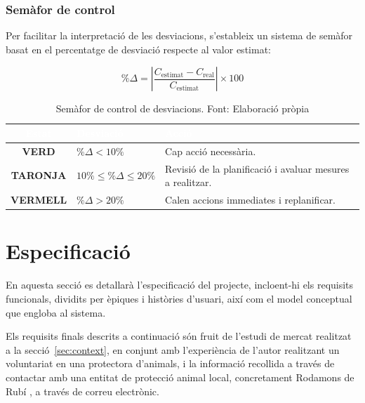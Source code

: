 \documentclass[11pt,a4paper]{report}
\begin{document}
\subsubsection{Semàfor de control}

Per facilitar la interpretació de les desviacions, s'estableix un sistema de semàfor 
basat en el percentatge de desviació respecte al valor estimat:

\begin{equation}
    \%\Delta = \left| \frac{C_{\text{estimat}} - C_{\text{real}}}{C_{\text{estimat}}} \right| \times 100
    \label{eq:percentatge_desv}
\end{equation}

\begin{table}[H]
    \centering
    \small
    \renewcommand{\arraystretch}{0.8}
    \begin{tabular}{|c|l|l|}
        \hline
        \rowcolor{oceanblue}
        \textcolor{white}{\textbf{Estat}} &
        \textcolor{white}{\textbf{Desviació}} &
        \textcolor{white}{\textbf{Acció}} \\
        \hline
        \cellcolor{green!50}\textbf{VERD}    & $\%\Delta < 10\%$          & Cap acció necessària. \\
        \hline
        \cellcolor{orange!60}\textbf{TARONJA} & $10\% \leq \%\Delta \leq 20\%$ & Revisió de la planificació i avaluar mesures a realitzar. \\
        \hline
        \cellcolor{red!50}\textbf{VERMELL}  & $\%\Delta > 20\%$          & Calen accions immediates i replanificar. \\
        \hline
    \end{tabular}
    \caption[Semàfor de control de desviacions]{Semàfor de control de desviacions. Font: Elaboració pròpia}
    \label{tab:semafar}
\end{table}
\newpage

\section{Especificació}
En aquesta secció es detallarà l'especificació del projecte, incloent-hi els requisits funcionals, dividits per èpiques i històries d'usuari, així com el model conceptual que engloba al sistema.

Els requisits finals descrits a continuació són fruit de l'estudi de mercat realitzat a la secció~\ref{sec:context}, en conjunt amb l'experiència de l'autor realitzant un voluntariat en una protectora d'animals, i la informació recollida a través de contactar amb una entitat de protecció animal local, concretament Rodamons de Rubí \cite{noauthor_gatos_nodate}, a través de correu electrònic.
\end{document}
